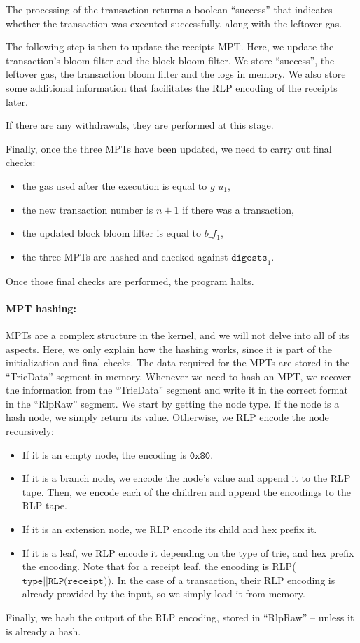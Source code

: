 The processing of the transaction returns a boolean ``success'' that indicates whether the transaction was executed successfully, along with the leftover gas. 

The following step is then to update the receipts MPT. Here, we update the transaction's bloom filter and the block bloom filter. We store ``success'', the leftover gas, the transaction bloom filter and the logs in memory. We also store some additional information that facilitates the RLP encoding of the receipts later.

If there are any withdrawals, they are performed at this stage.

Finally, once the three MPTs have been updated, we need to carry out final checks:
\begin{itemize}
    \item the gas used after the execution is equal to $g\_u_1$,
    \item the new transaction number is $n+1$ if there was a transaction,
    \item the updated block bloom filter is equal to $b\_f_1$,
    \item the three MPTs are hashed and checked against $\texttt{digests}_1$.
\end{itemize}
Once those final checks are performed, the program halts.

\paragraph{MPT hashing:}
MPTs are a complex structure in the kernel, and we will not delve into all of its aspects. Here, we only explain how the hashing works, since it is part of the initialization and final checks. 
The data required for the MPTs are stored in the ``TrieData'' segment in memory. Whenever we need to hash an MPT, we recover the information from the ``TrieData'' segment and write it in the correct format in the ``RlpRaw'' segment. We start by getting the node type. If the node is a hash node, we simply return its value. Otherwise, we RLP encode the node recursively:
\begin{itemize}
    \item If it is an empty node, the encoding is $\texttt{0x80}$.
    \item If it is a branch node, we encode the node's value and append it to the RLP tape. Then, we encode each of the children and append the encodings to the RLP tape.
    \item If it is an extension node, we RLP encode its child and hex prefix it.
    \item If it is a leaf, we RLP encode it depending on the type of trie, and hex prefix the encoding. Note that for a receipt leaf, the encoding is RLP($\texttt{type} || \texttt{RLP(receipt)})$. In the case of a transaction, their RLP encoding is already provided by the input, so we simply load it from memory.
\end{itemize}
Finally, we hash the output of the RLP encoding, stored in ``RlpRaw'' -- unless it is already a hash.

